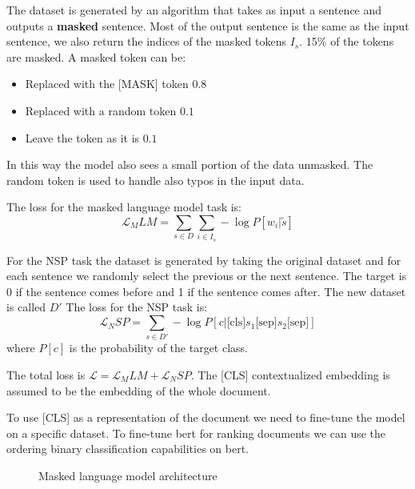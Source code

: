 The dataset is generated by an algorithm that takes as input a sentence and outputs a \textbf{masked} sentence.
Most of the output sentence is the same as the input sentence, we also return the indices of the masked tokens $I_s$.
15\% of the tokens are masked. A masked token can be:
\begin{itemize}
    \item Replaced with the [MASK] token $0.8$
    \item Replaced with a random token $0.1$
    \item Leave the token as it is $0.1$
\end{itemize}
In this way the model also sees a small portion of the data unmasked. The random token is used to handle also
typos in the input data.

The loss for the masked language model task is:
\[
    \mathcal{L}_MLM=\sum_{s\in D}\sum_{i\in I_s}-\log P[w_i|\tilde{s}]
\]

For the NSP task the dataset is generated by taking the original dataset and for each sentence
we randomly select the previous or the next sentence. The target is 0 if the sentence comes before
and 1 if the sentence comes after. The new dataset is called $D'$
The loss for the NSP task is:
\[
    \mathcal{L}_NSP=\sum_{s\in D'}-\log P[c|\text{[cls]}s_1\text{[sep]}s_2\text{[sep]}]
\]
where $P[c]$ is the probability of the target class.

The total loss is $\mathcal{L}=\mathcal{L}_MLM+\mathcal{L}_NSP$.
The [CLS] contextualized embedding is assumed to be the embedding of the whole document.

To use [CLS] as a representation of the document we need to fine-tune the model on a specific dataset.
To fine-tune bert for ranking documents we can use the ordering binary classification capabilities on bert.

\begin{figure}[H]
    \centering
    \caption{Masked language model architecture}
    \label{fig:masked_language_model_architecture}
\end{figure}

